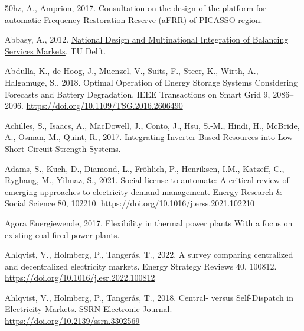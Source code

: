 \documentclass[12pt,a4paper,]{report}
\newlength{\cslhangindent}
\newenvironment{CSLReferences}[2] %
 {%
  \setlength{\parindent}{0pt}
  \ifodd #1 \everypar{\setlength{\hangindent}{\cslhangindent}}\ignorespaces\fi
  \ifnum #2 > 0
  \setlength{\parskip}{#2\baselineskip}
  \fi
 }%
 {}
\begin{document}
\hypertarget{refs}{}
\begin{CSLReferences}{1}{0}
\leavevmode{}%
50hz, A., Amprion, 2017. Consultation on the design of the platform for
automatic {Frequency Restoration Reserve} ({aFRR}) of {PICASSO} region.

\leavevmode{}%
Abbasy, A., 2012.
\href{https://doi.org/10.4233/uuid:71f7138f-3af2-4bc3-b035-a3e42b3cafaf}{National
{Design} and {Multinational Integration} of {Balancing Services
Markets}}. TU Delft.

\leavevmode{}%
Abdulla, K., de Hoog, J., Muenzel, V., Suits, F., Steer, K., Wirth, A.,
Halgamuge, S., 2018. Optimal {Operation} of {Energy Storage Systems
Considering Forecasts} and {Battery Degradation}. IEEE Transactions on
Smart Grid 9, 2086--2096. \url{https://doi.org/10.1109/TSG.2016.2606490}

\leavevmode{}%
Achilles, S., Isaacs, A., MacDowell, J., Conto, J., Hsu, S.-M., Hindi,
H., McBride, A., Osman, M., Quint, R., 2017. Integrating {Inverter-Based
Resources} into {Low Short Circuit Strength Systems}.

\leavevmode{}%
Adams, S., Kuch, D., Diamond, L., Fröhlich, P., Henriksen, I.M.,
Katzeff, C., Ryghaug, M., Yilmaz, S., 2021. Social license to automate:
{A} critical review of emerging approaches to electricity demand
management. Energy Research \& Social Science 80, 102210.
\url{https://doi.org/10.1016/j.erss.2021.102210}

\leavevmode{}%
Agora Energiewende, 2017. Flexibility in thermal power plants {With} a
focus on existing coal-fired power plants.

\leavevmode{}%
Ahlqvist, V., Holmberg, P., Tangerås, T., 2022. A survey comparing
centralized and decentralized electricity markets. Energy Strategy
Reviews 40, 100812. \url{https://doi.org/10.1016/j.esr.2022.100812}

\leavevmode{}%
Ahlqvist, V., Holmberg, P., Tangerås, T., 2018. Central- versus
{Self-Dispatch} in {Electricity Markets}. SSRN Electronic Journal.
\url{https://doi.org/10.2139/ssrn.3302569}


\end{CSLReferences}
\end{document}
